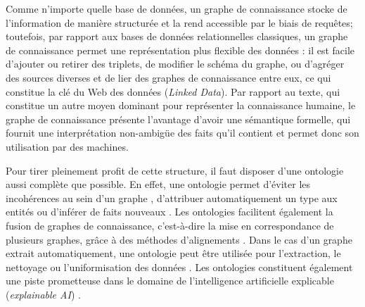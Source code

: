 Comme n'importe quelle base de données, un graphe de connaissance stocke de l'information de manière structurée et la rend accessible par le biais de requêtes; toutefois, par rapport aux bases de données relationnelles classiques, 
un graphe de connaissance permet une représentation plus flexible des données : il est facile d'ajouter ou retirer des triplets, de modifier le schéma du graphe, ou d'agréger des sources diverses et de lier des graphes de connaissance entre eux, ce qui constitue la clé du Web des données (\textit{Linked Data}).
Par rapport au texte, qui constitue un autre moyen dominant pour représenter la connaissance humaine, le graphe de connaissance présente l'avantage d'avoir une sémantique formelle, qui fournit une interprétation non-ambigüe des faits qu'il contient et permet donc son utilisation par des machines.

Pour tirer pleinement profit de cette structure, il faut disposer d'une ontologie aussi complète que possible. %
%
En effet, une ontologie permet d'éviter les incohérences au sein d'un graphe \cite{inconsistencies2012dbpedia}, d'attribuer automatiquement un type aux entités \cite{typing2017kejriwal} ou d'inférer de faits nouveaux \cite{inference2015dinto}. Les ontologies facilitent également la fusion de graphes de connaissance, c'est-à-dire la mise en correspondance de plusieurs graphes, grâce à des méthodes d'alignements \cite{otero2015ontology}. Dans le cas d'un graphe extrait automatiquement, une ontologie peut être utilisée pour l'extraction, le nettoyage ou l'uniformisation des données \cite{webmining2011bhatia, webmining2014li}. Les ontologies constituent également une piste prometteuse dans le domaine de l'intelligence artificielle explicable (\textit{explainable AI}) \cite{explainable2018holzinger, explainable2019cardillo, explainable2019semantic}.

